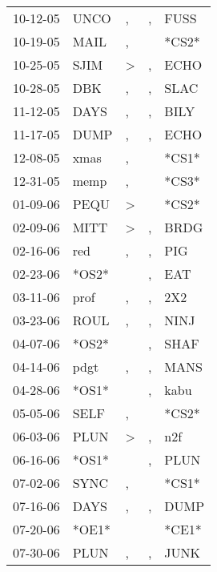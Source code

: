 \begin{supertabular}{lllll}
 10-12-05 &   UNCO &                , &                , &   FUSS \\
 10-19-05 &   MAIL &                , &                  &  *CS2* \\
 10-25-05 &   SJIM &     \textgreater &                , &   ECHO \\
 10-28-05 &    DBK &                , &                , &   SLAC \\
 11-12-05 &   DAYS &                , &                , &   BILY \\
 11-17-05 &   DUMP &                , &                , &   ECHO \\
 12-08-05 &   xmas &                , &                  &  *CS1* \\
 12-31-05 &   memp &                , &                  &  *CS3* \\
 01-09-06 &   PEQU &     \textgreater &                  &  *CS2* \\
 02-09-06 &   MITT &     \textgreater &                , &   BRDG \\
 02-16-06 &    red &                , &                , &    PIG \\
 02-23-06 &  *OS2* &                  &                , &    EAT \\
 03-11-06 &   prof &                , &                , &    2X2 \\
 03-23-06 &   ROUL &                , &                , &   NINJ \\
 04-07-06 &  *OS2* &                  &                , &   SHAF \\
 04-14-06 &   pdgt &                , &                , &   MANS \\
 04-28-06 &  *OS1* &                  &                , &   kabu \\
 05-05-06 &   SELF &                , &                  &  *CS2* \\
 06-03-06 &   PLUN &     \textgreater &                , &    n2f \\
 06-16-06 &  *OS1* &                  &                , &   PLUN \\
 07-02-06 &   SYNC &                , &                  &  *CS1* \\
 07-16-06 &   DAYS &                , &                , &   DUMP \\
 07-20-06 &  *OE1* &                  &                  &  *CE1* \\
 07-30-06 &   PLUN &                , &                , &   JUNK \\

\end{supertabular}
